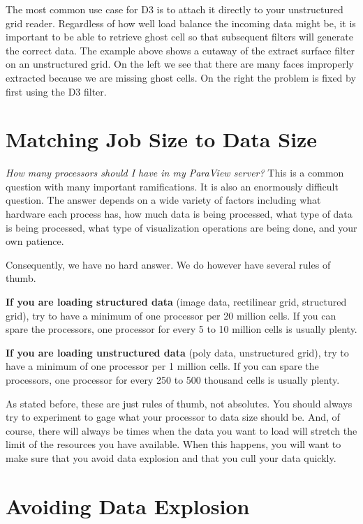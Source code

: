 The most common use case for D3 is to attach it directly to your
unstructured grid reader.  Regardless of how well load balance the incoming
data might be, it is important to be able to retrieve ghost cell so that
subsequent filters will generate the correct data.  The example above shows
a cutaway of the extract surface filter on an unstructured grid.  On the
left we see that there are many faces improperly extracted because we are
missing ghost cells.  On the right the problem is fixed by first using the
D3 filter.


\section{Matching Job Size to Data Size}

\emph{How many processors should I have in my ParaView server?}  This is a
common question with many important ramifications.  It is also an
enormously difficult question.  The answer depends on a wide variety of
factors including what hardware each process has, how much data is being
processed, what type of data is being processed, what type of visualization
operations are being done, and your own patience.

Consequently, we have no hard answer.  We do however have several rules of thumb.

\textbf{If you are loading structured data} (image data, rectilinear grid,
structured grid), try to have a minimum of one processor per 20 million
cells.  If you can spare the processors, one processor for every 5 to 10
million cells is usually plenty.

\textbf{If you are loading unstructured data} (poly data, unstructured
grid), try to have a minimum of one processor per 1 million cells.  If you
can spare the processors, one processor for every 250 to 500 thousand cells
is usually plenty.

As stated before, these are just rules of thumb, not absolutes.  You should
always try to experiment to gage what your processor to data size should
be.  And, of course, there will always be times when the data you want to
load will stretch the limit of the resources you have available.  When this
happens, you will want to make sure that you avoid data explosion and that
you cull your data quickly.


\section{Avoiding Data Explosion}

